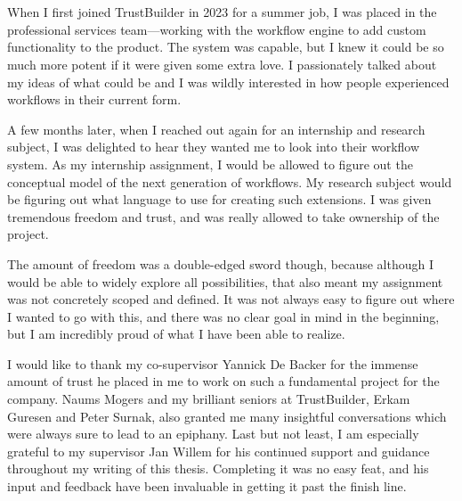 
\chapter*{}%
\label{ch:voorwoord}

When I first joined TrustBuilder in 2023 for a summer job, I was placed in the professional services team---working with the workflow engine to add custom functionality to the product. The system was capable, but I knew it could be so much more potent if it were given some extra love. I passionately talked about my ideas of what could be and I was wildly interested in how people experienced workflows in their current form.

A few months later, when I reached out again for an internship and research subject, I was delighted to hear they wanted me to look into their workflow system. As my internship assignment, I would be allowed to figure out the conceptual model of the next generation of workflows. My research subject would be figuring out what language to use for creating such extensions. I was given tremendous freedom and trust, and was really allowed to take ownership of the project. 

The amount of freedom was a double-edged sword though, because although I would be able to widely explore all possibilities, that also meant my assignment was not concretely scoped and defined. It was not always easy to figure out where I wanted to go with this, and there was no clear goal in mind in the beginning, but I am incredibly proud of what I have been able to realize.

I would like to thank my co-supervisor Yannick De Backer for the immense amount of trust he placed in me to work on such a fundamental project for the company. Naums Mogers and my brilliant seniors at TrustBuilder, Erkam Guresen and Peter Surnak, also granted me many insightful conversations which were always sure to lead to an epiphany. Last but not least, I am especially grateful to my supervisor Jan Willem for his continued support and guidance throughout my writing of this thesis. Completing it was no easy feat, and his input and feedback have been invaluable in getting it past the finish line.